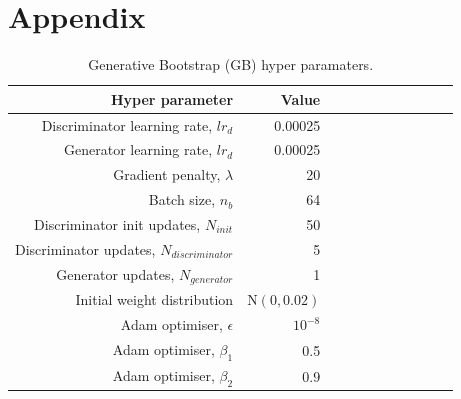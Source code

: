 \documentclass[12pt]{article}
\begin{document}
\section*{Appendix}
\begin{table}[h!]
\centering
\setlength{\tabcolsep}{0.45em} 
\begin{tabular}{rrrrrrrrrrr}
\toprule\toprule
Hyper parameter & Value \\ \midrule
Discriminator learning rate, $lr_{d}$ & 0.00025 \\
Generator learning rate, $lr_{d}$ & 0.00025 \\
Gradient penalty, $\lambda$ & 20 \\
Batch size, $n_b$ & 64 \\
Discriminator init updates, $N_{init}$ & 50 \\
Discriminator updates, $N_{discriminator}$ & 5 \\
Generator updates, $N_{generator} $& 1 \\
Initial weight distribution & $\text{N}(0, 0.02)$ \\
Adam optimiser, $\epsilon$ & $10^{-8}$ \\
Adam optimiser, $\beta_1$ & 0.5 \\
Adam optimiser, $\beta_2$ & 0.9 \\ \bottomrule\bottomrule
\end{tabular}
\caption{Generative Bootstrap (GB) hyper paramaters.}
\label{table:hypers}
\end{table}
\end{document}
